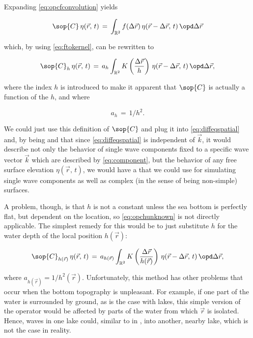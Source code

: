 Expanding \eqref{eq:opcfconvolution} yields

\begin{equation} \label{eq:opcfintegral}
\sop{C}\,\eta(\vec{r},\,t) \,=\, \int_{\mathbb{R}^2}f(\Delta\vec{r})\,\eta(\vec{r}-\Delta\vec{r},\,t)\,\opd\Delta\vec{r}
\end{equation}

which, by using \eqref{eq:ftokernel}, can be rewritten to

\begin{equation} \label{eq:opchunknown}
\sop{C}_h\,\eta(\vec{r},\,t) \,=\, a_h\int_{\mathbb{R}^2}K\left(\frac{\Delta\vec{r}}{h}\right)\,\eta(\vec{r}-\Delta\vec{r},\,t)\,\opd\Delta\vec{r},
\end{equation}

where the index $h$ is introduced to make it apparent that $\sop{C}$ is actually a function of the  $h$, and where

\begin{equation} \label{eq:aofh}
a_h \,=\, 1/h^2.
\end{equation}

We could just use this definition of $\sop{C}$ and plug it into \eqref{eq:diffeqspatial} and, by being \naive and \assuming that since \eqref{eq:diffeqspatial} is independent of $\vec{k}$, it would describe not only the behavior of single wave components fixed to a specific wave vector $\vec{k}$ which are described by \eqref{eq:component}, but the behavior of any free surface elevation $\eta(\vec{r},\,t)$, we would have a \PDE that we could use for simulating single wave components as well as complex (in the sense of being non-simple) surfaces.

A problem, though, is that $h$ is not a constant unless the sea bottom is perfectly flat, but dependent on the location, so \eqref{eq:opchunknown} is not directly applicable. The simplest remedy for this would be to just substitute $h$ for the water depth of the local position $h(\vec{r})$:

\begin{equation} \label{eq:opchlocal}
\sop{C}_{h(\vec{r})}\,\eta(\vec{r},\,t) \,=\, a_{h(\vec{r})}\int_{\mathbb{R}^2}K\left(\frac{\Delta\vec{r}}{h(\vec{r})}\right)\,\eta(\vec{r}-\Delta\vec{r},\,t)\,\opd\Delta\vec{r},
\end{equation}

where $a_{h(\vec{r})} = 1/h^2(\vec{r})$. Unfortunately, this method has other problems that occur when the bottom topography is unpleasant. For example, if one part of the water is surrounded by ground, as is the case with lakes, this simple version of the operator would be affected by parts of the water from which $\vec{r}$ is isolated. Hence, waves in one lake could, similar to in , \tunnel into another, nearby lake, which is not the case in reality.

